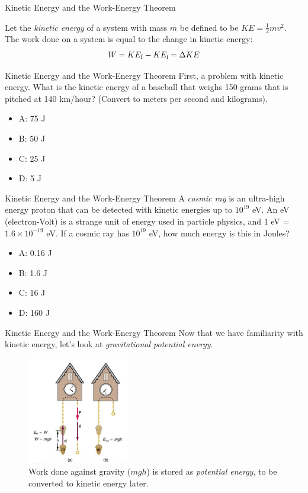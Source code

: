 \documentclass{beamer}
\begin{document}
\begin{frame}{Kinetic Energy and the Work-Energy Theorem}
\begin{tcolorbox}[colback=white,colframe=red!40!blue,title=The Work-Energy Theorem]
\small
\alert{
Let the \textit{kinetic energy} of a system with mass $m$ be defined to be $KE = \frac{1}{2}mv^2$.  The work done on a system is equal to the change in kinetic energy:
\begin{equation}
W = KE_{\rm f} - KE_{\rm i} = \Delta KE
\end{equation}
}
\end{tcolorbox}
\end{frame}

\begin{frame}{Kinetic Energy and the Work-Energy Theorem}
First, a problem with kinetic energy.  What is the kinetic energy of a baseball that weighs 150 grams that is pitched at 140 km/hour?  (Convert to meters per second and kilograms).
\begin{itemize}
\item A: 75 J
\item B: 50 J
\item C: 25 J
\item D: 5 J
\end{itemize}
\end{frame}

\begin{frame}{Kinetic Energy and the Work-Energy Theorem}
A \textit{cosmic ray} is an ultra-high energy proton that can be detected with kinetic energies up to $10^{19}$ eV.  An eV (electron-Volt) is a strange unit of energy used in particle physics, and 1 eV = $1.6 \times 10^{-19}$ eV.  If a cosmic ray has $10^{19}$ eV, how much energy is this in Joules?
\begin{itemize}
\item A: 0.16 J
\item B: 1.6 J
\item C: 16 J
\item D: 160 J
\end{itemize}
\end{frame}

\begin{frame}{Kinetic Energy and the Work-Energy Theorem}
Now that we have familiarity with kinetic energy, let's look at \textit{gravitational potential energy}.
\begin{figure}
\centering
\includegraphics[width=0.4\textwidth]{figures/clock.png}
\caption{\label{fig:clock} Work done against gravity ($m g h$) is stored as \textit{potential energy}, to be converted to kinetic energy later.}
\end{figure}
\end{frame}
\end{document}
